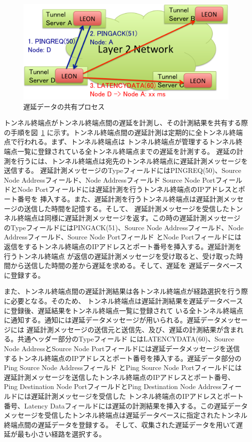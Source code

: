 \begin{figure}
	\begin{center}
		\includegraphics[scale=0.60]{./img/latencyproc}
		\caption{遅延データの共有プロセス}
		\label{img:ldproc}
	\end{center}
\end{figure}

トンネル終端点がトンネル終端点間の遅延を計測し、その計測結果を共有する際の手順を図~\ref{img:ldproc}
に示す。トンネル終端点間の遅延計測は定期的に全トンネル終端点で行われる。まず、トンネル終端点は
トンネル終端点が管理するトンネル終端点一覧に登録されている全トンネル終端点までの遅延を計測する。
遅延の計測を行うには、トンネル終端点は宛先のトンネル終端点に遅延計測メッセージを送信する。
遅延計測メッセージのTypeフィールドにはPINGREQ(50)、Source Node Addressフィールド、Node Addressフィールド
Source Node PortフィールドとNode Portフィールドには遅延計測を行うトンネル終端点のIPアドレスとポート番号を
挿入する。また、遅延計測を行うトンネル終端点は遅延計測メッセージの送信した時間を記憶する。そして、
遅延計測メッセージを受信したトンネル終端点は同様に遅延計測メッセージを返す。この時の遅延計測メッセージ
のTypeフィールドにはPINGACK(51)、Source Node Addressフィールド、Node Addressフィールド、Source Node Portフィールド
とNode Portフィールドには返信をするトンネル終端点のIPアドレスとポート番号を挿入する。遅延計測を行うトンネル終端点
が返信の遅延計測メッセージを受け取ると、受け取った時間から送信した時間の差から遅延を求める。そして、遅延を
遅延データベースに登録する。

また、トンネル終端点間の遅延計測結果は各トンネル終端点が経路選択を行う際に必要となる。そのため、
トンネル終端点は遅延計測結果を遅延データベースに登録後、遅延結果をトンネル終端点一覧に登録されて
いる全トンネル終端点に通知する。通知には遅延データメッセージが用いられる。遅延データメッセージには
遅延計測メッセージの送信元と送信先、及び、遅延の計測結果が含まれる。共通ヘッダー部分のTypeフィールド
にはLATENCYDATA(60)、Source Node AddressとSource Node Portフィールドには遅延データメッセージを送信
するトンネル終端点のIPアドレスとポート番号を挿入する。遅延データ部分のPing Source Node Addressフィールド
とPing Source Node Portフィールドには遅延計測メッセージを送信したトンネル終端点のIPアドレスとポート番号、
Ping Destination Node PortフィールドとPing Destination Node Addressフィールドには遅延計測メッセージを受信した
トンネル終端点のIPアドレスとポート番号、Latency Dataフィールドには遅延の計測結果を挿入する。この遅延データ
メッセージを受信したトンネル終端点は遅延データベースに指定されたトンネル終端点間の遅延データを登録する。
そして、収集された遅延データを用いて遅延が最も小さい経路を選択する。

